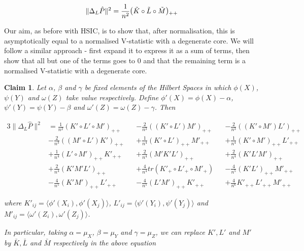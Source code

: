\documentclass[12pt]{article}
\newtheorem{claim}{Claim}
\numberwithin{claim}{section}
\numberwithin{lemma}{section}
\numberwithin{theorem}{section}
\begin{document}
\begin{align*}
\|\Delta_L \hat{P}\|^2 = \frac{1}{n^2}\mathlarger{(}\tilde{K}\circ\tilde{L}\circ\tilde{M}\mathlarger{)}_{++}
\end{align*}

Our aim, as before with HSIC, is to show that, after normalisation, this is asymptotically equal to a normalised V-statistic with a degenerate core. We will follow a similar approach - first expand it to express it as a sum of terms, then show that all but one of the terms goes to 0 and that the remaining term is a normalised V-statistic with a degenerate core.

\begin{claim}\label{claim:Lancasterinvariant}
Let $\alpha$, $\beta$ and $\gamma$ be fixed elements of the Hilbert Spaces in which $\phi(X)$, $\psi(Y)$ and $\omega(Z)$ take value respectively. Define $\phi'(X) = \phi(X) - \alpha$, $\psi'(Y) = \psi(Y) - \beta$ and $\omega'(Z) = \omega(Z) - \gamma$. Then

\begin{alignat*}{3}
\|\Delta_L \hat{P}\|^2 &= \frac{1}{n^2}(K' \circ L'\circ M')_{++} && -
\frac{2}{n^3}((K'\circ L') M')_{++} && - 
\frac{2}{n^3}((K' \circ M') L')_{++} \\ & - 
\frac{2}{n^3}((M' \circ L') K')_{++} && + 
\frac{1}{n^4}(K' \circ L')_{++} M'_{++} && + 
\frac{1}{n^4}(K' \circ M')_{++} L'_{++} \\ & + 
\frac{1}{n^4}(L' \circ M')_{++} K'_{++} && + 
\frac{2}{n^4}(M'K'L')_{++} && + 
\frac{2}{n^4}(K'L'M')_{++} \\& + 
\frac{2}{n^4}(K'M'L')_{++} && + 
\frac{4}{n^4}tr(K'_+ \circ L'_+ \circ M'_+) && -
\frac{4}{n^5}(K' L')_{++} M'_{++} \\ & - 
\frac{4}{n^5}(K'M')_{++}L'_{++} && - 
\frac{4}{n^5}(L'M')_{++} K'_{++} && +
\frac{4}{n^6}K'_{++} L'_{++} M'_{++}
\end{alignat*}

where $K'_{ij} = \langle \phi'(X_i), \phi'(X_j) \rangle$, $L'_{ij} = \langle \psi'(Y_i), \psi'(Y_j) \rangle$ and $M'_{ij} = \langle \omega'(Z_i), \omega'(Z_j) \rangle$. 

\bigskip

In particular, taking $\alpha = \mu_X$, $\beta  = \mu_Y$ and $\gamma = \mu_Z$, we can replace $K', L'$ and $M'$ by $\bar{K}, \bar{L}$ and $\bar{M}$ respectively in the above equation

\end{claim}
\end{document}

